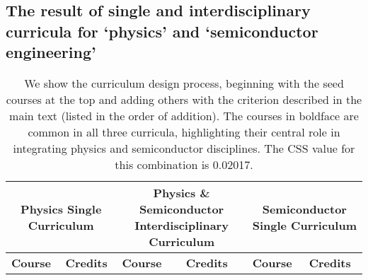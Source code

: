 \documentclass{bmcart}
\begin{document}
\begin{landscape}

\setcounter{section}{0}
\renewcommand{\thetable}{S\arabic{table}}
\renewcommand\thesection{S\arabic{section}.}

\section{The result of single and interdisciplinary curricula for `physics' and `semiconductor engineering'}
\tiny
\label{table:physics_semiconductor_combination}

\setlength{\tabcolsep}{5pt} %
\renewcommand{\arraystretch}{1.2} %

\begin{longtable}{p{3.5cm}|p{1cm}|p{7cm}|p{1cm}|p{7cm}|p{1cm}}
\caption{We show the curriculum design process, beginning with the seed courses at the top and adding others with the criterion described in the main text (listed in the order of addition). The courses in boldface are common in all three curricula, highlighting their central role in integrating physics and semiconductor disciplines. The CSS value for this combination is 0.02017.} \\
\hline \hline
\multicolumn{2}{c|}{\textbf{Physics Single Curriculum}} & \multicolumn{2}{c|}{\textbf{Physics \& Semiconductor Interdisciplinary Curriculum}} & \multicolumn{2}{c}{\textbf{Semiconductor Single Curriculum}} \\
\hline
\scriptsize \textbf{Course} & \scriptsize \textbf{Credits} & \scriptsize \textbf{Course} & \scriptsize \textbf{Credits} & \scriptsize \textbf{Course} & \scriptsize \textbf{Credits} \\
\hline


\end{longtable}
\end{landscape}
\end{document}
